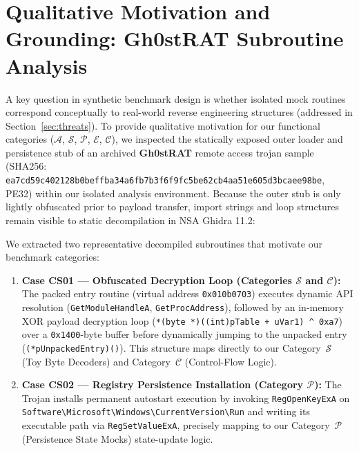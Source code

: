 \documentclass[runningheads]{llncs}
\begin{document}
\section{Qualitative Motivation and Grounding: Gh0stRAT Subroutine Analysis}
\label{sec:case_study}
A key question in synthetic benchmark design is whether isolated mock routines correspond conceptually to real-world reverse engineering structures (addressed in Section~\ref{sec:threats}). To provide qualitative motivation for our functional categories ($\mathcal{A}$, $\mathcal{S}$, $\mathcal{P}$, $\mathcal{E}$, $\mathcal{C}$), we inspected the statically exposed outer loader and persistence stub of an archived \textbf{Gh0stRAT} remote access trojan sample (SHA256: \texttt{ea7cd59c402128b0beffba34a6fb7b3f6f9fc5be62cb4aa51e605d3bcaee98be}, PE32) within our isolated analysis environment. Because the outer stub is only lightly obfuscated prior to payload transfer, import strings and loop structures remain visible to static decompilation in NSA Ghidra 11.2:

We extracted two representative decompiled subroutines that motivate our benchmark categories:
\begin{enumerate}
    \item \textbf{Case CS01 --- Obfuscated Decryption Loop (Categories $\mathcal{S}$ and $\mathcal{C}$):} The packed entry routine (virtual address \texttt{0x010b0703}) executes dynamic API resolution (\texttt{GetModuleHandleA}, \texttt{GetProcAddress}), followed by an in-memory XOR payload decryption loop (\texttt{*(byte *)((int)pTable + uVar1) \^{} 0xa7}) over a \texttt{0x1400}-byte buffer before dynamically jumping to the unpacked entry (\texttt{(*pUnpackedEntry)()}). This structure maps directly to our Category~$\mathcal{S}$ (Toy Byte Decoders) and Category~$\mathcal{C}$ (Control-Flow Logic).
    \item \textbf{Case CS02 --- Registry Persistence Installation (Category $\mathcal{P}$):} The Trojan installs permanent autostart execution by invoking \texttt{RegOpenKeyExA} on \texttt{Software\textbackslash Microsoft\textbackslash Windows\textbackslash CurrentVersion\textbackslash Run} and writing its executable path via \texttt{RegSetValueExA}, precisely mapping to our Category~$\mathcal{P}$ (Persistence State Mocks) state-update logic.
\end{enumerate}
\end{document}
